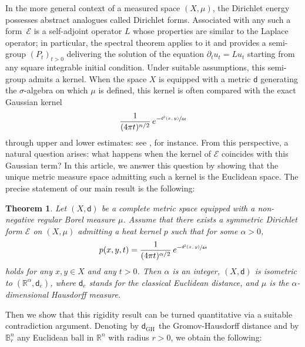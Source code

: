 \documentclass[10pt]{amsart}
\newcommand{\sGH}{{\scriptscriptstyle\mathrm{GH}\,}}
\theoremstyle{plain}
\newtheorem{theorem}{Theorem}[section]
\theoremstyle{definition}
\newcommand{\setR}{\mathbb{R}}
\newcommand{\setB}{\mathbb{B}}
\newcommand{\cE}{\mathcal{E}}
\newcommand{\dist}{\mathsf{d}}
\begin{document}
In the more general context of a measured space $(X,\mu)$, the Dirichlet energy possesses abstract analogues called Dirichlet forms. Associated with any such a form~$\cE$ is a self-adjoint operator $L$ whose properties are similar to the Laplace operator; in particular, the spectral theorem applies to it and provides a semi-group $(P_t)_{t>0}$ delivering the solution of the equation $\partial_t u_t = L u_t$ starting from any square integrable initial condition. Under suitable assumptions, this semi-group admits a kernel. When the space $X$ is equipped with a metric $\dist$ generating the $\sigma$-algebra on which $\mu$ is defined, this kernel is often compared with the exact Gaussian kernel
\[
\frac{1}{(4 \pi t)^{n/2}}\, e^{-\sfrac{\dist^2(x,y)}{4t}}
\]
through upper and lower estimates: see \cite{Sturm2}, for instance. From this perspective, a natural question arises: what happens when the kernel of $\cE$ coincides with this Gaussian term? In this article, we answer this question by showing that the unique metric measure space admitting such a kernel is the Euclidean space. The precise statement of our main result is the following:


\begin{theorem}\label{th:main}
Let $(X,\dist)$ be a complete metric space equipped with a non-negative regular Borel measure $\mu$. Assume that there exists a symmetric Dirichlet form $\cE$ on $(X,\mu)$ admitting a heat kernel $p$ such that for some $\alpha>0$,
\begin{equation}\label{eq:heatkernel}
p(x,y,t) = \frac{1}{(4 \pi t)^{\alpha/2}}\, e^{-\sfrac{\dist^2(x,y)}{4t}}
\end{equation}
holds for any $x,y \in X$ and any $t>0$. Then $\alpha$ is an integer, $(X,\dist)$ is isometric to $(\setR^\alpha,\dist_e)$, where $\dist_e$ stands for the classical Euclidean distance, and $\mu$ is the $\alpha$-dimensional Hausdorff measure.
\end{theorem}


Then we show that this rigidity result can be turned quantitative via a suitable contradiction argument. Denoting by $\dist_{\sGH}$ the Gromov-Hausdorff distance and by $\setB^n_r$ any Euclidean ball in $\setR^n$ with radius $r>0$, we obtain the following:
\end{document}
